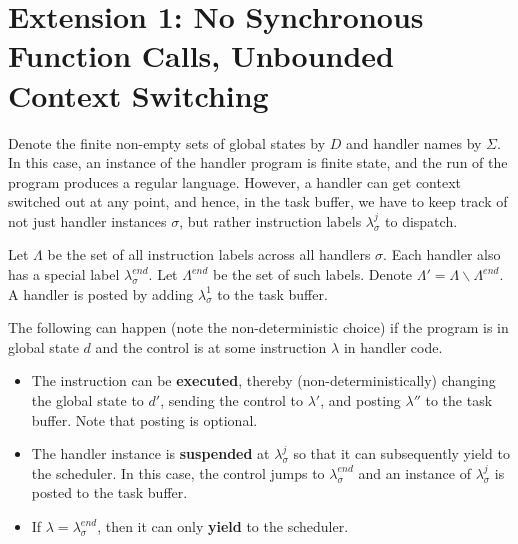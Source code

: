 \documentclass{article}
\theoremstyle{remark}
\begin{document}
\section{Extension 1: No Synchronous Function Calls, Unbounded Context Switching}
Denote the finite non-empty sets of global states by $D$ and handler names by $\Sigma$. In this case, an instance of the handler program is finite state, and the run of the program produces a regular language. However, a handler can get context switched out at any point, and hence, in the task buffer, we have to keep track of not just handler instances $\sigma$, but rather instruction labels $\lambda_\sigma^j$ to dispatch. 

Let $\Lambda$ be the set of all instruction labels across all handlers $\sigma$. Each handler also has a special label $\lambda^{end}_\sigma$.  Let $\Lambda^{end}$ be the set of such labels. Denote $\Lambda' = \Lambda \backslash \Lambda^{end}$. A handler is posted by adding $\lambda_\sigma^1$ to the task buffer.

The following can happen (note the non-deterministic choice) if the program is in global state $d$ and the control is at some instruction $\lambda$ in handler code.
\begin{itemize}
\item The instruction can be \textbf{executed}, thereby (non-deterministically) changing the global state to $d'$, sending the control to $\lambda'$, and posting $\lambda''$ to the task buffer. Note that posting is optional.
\item The handler instance is \textbf{suspended} at $\lambda_\sigma^j$ so that it can subsequently yield to the scheduler. In this case, the control jumps to $\lambda_\sigma^{end}$ and an instance of $\lambda_\sigma^j$ is posted to the task buffer.
\item If $\lambda = \lambda_\sigma^{end}$, then it can only \textbf{yield} to the scheduler.
\end{itemize}
\end{document}
